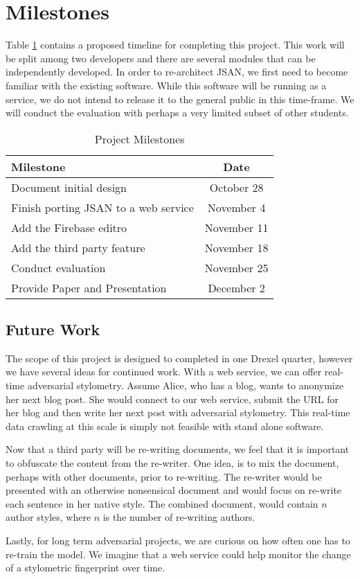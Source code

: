 \documentclass[letterpaper]{article}
\begin{document}
\section*{Milestones}\label{sec:milestones}

Table \ref{tab:milestones} contains a proposed timeline for completing
this project.  This work will be split among two developers and there
are several modules that can be independently developed.  In order to
re-architect JSAN, we first need to become familiar with the existing
software.  While this software will be running as a service, we do not
intend to release it to the general public in this time-frame.  We
will conduct the evaluation with perhaps a very limited subset of
other students.


\begin{table}
  \centering
  \begin{tabular}{l | c}
    Milestone & Date\\
    \hline

    Document initial design & October 28\\
    Finish porting JSAN to a web service & November 4\\
    Add the Firebase editro & November 11\\
    Add the third party feature & November 18\\
    Conduct evaluation & November 25\\
    Provide Paper and Presentation & December 2

  \end{tabular}
  \caption{Project Milestones}
  \label{tab:milestones}
\end{table}


\subsection*{Future Work}

The scope of this project is designed to completed in one Drexel
quarter, however we have several ideas for continued work.  With a web
service, we can offer real-time adversarial stylometry.  Assume Alice,
who has a blog, wants to anonymize her next blog post.  She would
connect to our web service, submit the URL for her blog and then write
her next post with adversarial stylometry.  This real-time data
crawling at this scale is simply not feasible with stand alone
software.

Now that a third party will be re-writing documents, we feel that it
is important to obfuscate the content from the re-writer.  One idea,
is to mix the document, perhaps with other documents, prior to
re-writing.  The re-writer would be presented with an otherwise
nonsensical document and would focus on re-write each sentence in her
native style.  The combined document, would contain $n$ author styles,
where $n$ is the number of re-writing authors.

Lastly, for long term adversarial projects, we are curious on how often
one has to re-train the model.  We imagine that a web service could
help monitor the change of a stylometric fingerprint over time.




\end{document}
